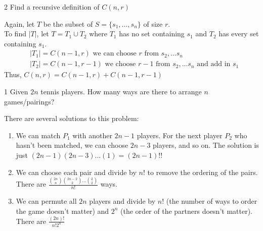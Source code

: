 \documentclass[11pt,twosided]{article}
\begin{document}
\begin{exercise}
    2 Find a recursive definition of $C(n, r)$
\end{exercise}

\begin{solution}
    Again, let $T$ be the subset of $S = \{s_1, ... , s_n\}$ of size $r$.\\
    To find $|T|$, let $T = T_1 \cup T_2$ where $T_1$ has no set containing $s_1$ and $T_2$ has every set containing $s_1$.
    \begin{align*}
        &|T_1| = C(n-1, r) \text{ we can choose $r$ from $s_2, ... s_n$}\\
        &|T_2| = C(n-1, r-1) \text{ we choose $r-1$ from $s_2, ... s_n$ and add in $s_1$}
    \end{align*}
    Thus, $\boxed{C(n, r) = C(n-1, r) + C(n-1, r-1)}$
\end{solution}

\begin{problem}
    1 Given $2n$ tennis players. How many ways are there to arrange $n$ games/pairings?
\end{problem}

\begin{solution}
    There are several solutions to this problem:
    \begin{enumerate}
        \item We can match $P_1$ with another $2n - 1$ players. For the next player $P_2$ who hasn't been matched, we can choose $2n - 3$ players, and so on. The solution is just $(2n-1)(2n-3)...(1) = \boxed{(2n-1)!!}$
        \item We can choose each pair and divide by $n!$ to remove the ordering of the pairs. There are $\boxed{\frac{\binom{2n}{n}\binom{2n-2}{2} ... \binom{2}{2}}{n!}}$ ways. 
        \item We can permute all $2n$ players and divide by $n!$ (the number of ways to order the game doesn't matter) and $2^n$ (the order of the partners doesn't matter). There are $\boxed{\frac{(2n)!}{n!2^n}}$
    \end{enumerate}

\end{solution}
\end{document}
